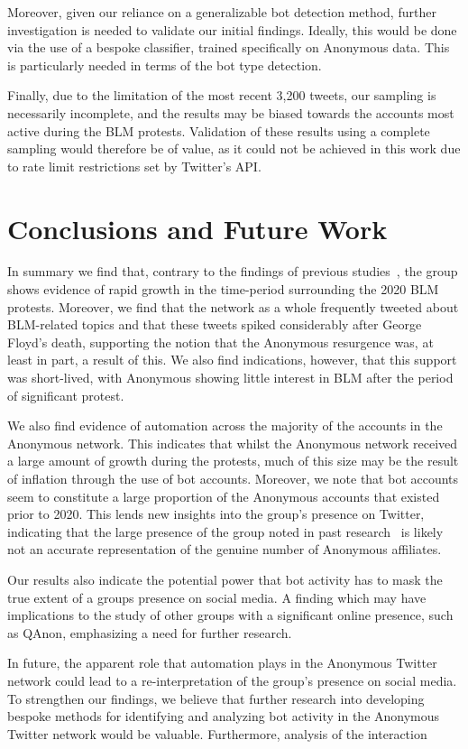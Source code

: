 \documentclass[letterpaper]{article}
\begin{document}
Moreover, given our reliance on a generalizable bot detection method, further investigation is needed to validate our initial findings. Ideally, this would be done via the use of a bespoke classifier, trained specifically on Anonymous data. This is particularly needed in terms of the bot type detection.

Finally, due to the limitation of the most recent 3,200 tweets, our sampling is necessarily incomplete, and the results may be biased towards the accounts most active during the BLM protests. Validation of these results using a complete sampling would therefore be of value, as it could not be achieved in this work due to rate limit restrictions set by Twitter's API.

\section{Conclusions and Future Work}

In summary we find that, contrary to the findings of previous studies~\cite{Jones2020,Uitermark2017}, the group shows evidence of rapid growth in the time-period surrounding the 2020 BLM protests. Moreover, we find that the network as a whole frequently tweeted about BLM-related topics and that these tweets spiked considerably after George Floyd's death, supporting the notion that the Anonymous resurgence was, at least in part, a result of this. We also find indications, however, that this support was short-lived, with Anonymous showing little interest in BLM after the period of significant protest.

We also find evidence of automation across the majority of the accounts in the Anonymous network. This indicates that whilst the Anonymous network received a large amount of growth during the protests, much of this size may be the result of inflation through the use of bot accounts. Moreover, we note that bot accounts seem to constitute a large proportion of the Anonymous accounts that existed prior to 2020. This lends new insights into the group's presence on Twitter, indicating that the large presence of the group noted in past research~\cite{Jones2020} is likely not an accurate representation of the genuine number of Anonymous affiliates.

Our results also indicate the potential power that bot activity has to mask the true extent of a groups presence on social media. A finding which may have implications to the study of other groups with a significant online presence, such as QAnon, emphasizing a need for further research.

In future, the apparent role that automation plays in the Anonymous Twitter network could lead to a re-interpretation of the group's presence on social media. To strengthen our findings, we believe that further research into developing bespoke methods for identifying and analyzing bot activity in the Anonymous Twitter network would be valuable. Furthermore, analysis of the interaction


\fontsize{9.0pt}{10.0pt}
\selectfont
\clearpage

\end{document}
